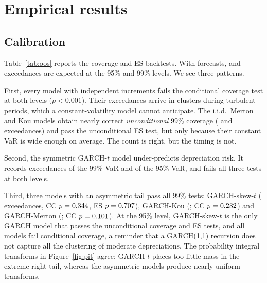 \documentclass[11pt]{article}
\begin{document}
\section{Empirical results}\label{sec:results}

\subsection{Calibration}

Table~\ref{tab:oos} reports the coverage and ES backtests. With \oosN{} forecasts, \expNinetyFive{} and \expNinetyNine{} exceedances are expected at the 95\% and 99\% levels. We see three patterns.

First, every model with independent increments fails the conditional coverage test at both levels ($p<0.001$). Their exceedances arrive in clusters during turbulent periods, which a constant-volatility model cannot anticipate. The i.i.d.\ Merton and Kou models obtain nearly correct \emph{unconditional} 99\% coverage (\excNNMerton{} and \excNNKou{} exceedances) and pass the unconditional ES test, but only because their constant VaR is wide enough on average. The count is right, but the timing is not.

Second, the symmetric GARCH-$t$ model under-predicts depreciation risk. It records \excNNGarchT{} exceedances of the 99\% VaR and \excNFGarchT{} of the 95\% VaR, and fails all three tests at both levels.

Third, three models with an asymmetric tail pass all 99\% tests: GARCH-skew-$t$ (\excNNGarchSkewT{} exceedances, CC $p=0.344$, ES $p=0.707$), GARCH-Kou (\excNNGarchKou; CC $p=0.232$) and GARCH-Merton (\excNNGarchMerton; CC $p=0.101$). At the 95\% level, GARCH-skew-$t$ is the only GARCH model that passes the unconditional coverage and ES tests, and all models fail conditional coverage, a reminder that a GARCH(1,1) recursion does not capture all the clustering of moderate depreciations. The probability integral transforms in Figure~\ref{fig:pit} agree: GARCH-$t$ places too little mass in the extreme right tail, whereas the asymmetric models produce nearly uniform transforms.

\begin{table}[t]
\centering\small
\caption{Out-of-sample calibration, \oosStart{} -- \sampleEnd{} ($n=\oosN$). NLS: mean negative log score. Exc.: VaR exceedances (expected \expNinetyFive{} and \expNinetyNine). UC: Kupiec unconditional coverage $p$-value. CC: Christoffersen conditional coverage $p$-value. ES: Du--Escanciano unconditional ES backtest $p$-value.}\label{tab:oos}
\resizebox{\linewidth}{!}{}
\end{table}
\end{document}
